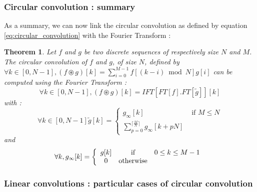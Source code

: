 \documentclass[a4paper,10pt,twoside]{article}
\newtheorem{myTheorem}{Theorem}
\begin{document}
\pagebreak
\subsubsection{Circular convolution : summary}

As a summary, we can now link the circular convolution as defined by equation \ref{eq:circular_convolution} with the Fourier Transform :
\begin{myTheorem}
Let $f$ and $g$ be two discrete sequences of respectively size $N$ and $M$. The circular convolution of $f$ and $g$, of size $N$, defined by $\forall k \in [0,N-1], (f\circledast g)[k] = \sum_{i=0}^{M-1} f[(k-i) \bmod N] g[i]$ can be computed using the Fourier Transform :
\begin{equation*}
\forall k \in [0,N-1], (f\circledast g)[k] = IFT[FT[f] . FT[\tilde{g}]][k]
\end{equation*}
with :
\begin{equation*}
\forall k \in [0,N-1] \tilde{g}[k] =
 \begin{cases}
 g_\infty[k] & \mbox{ if $M \leq N$} \\
 \sum_{p=0}^{\lceil \frac{M}{N}\rceil} g_\infty[k + pN]
 \end{cases}
\end{equation*}
and 
\begin{equation*}
\forall k, g_\infty[k] = \left\lbrace
\begin{array}{ccc}
g[k]     & \mbox{if} & 0 \leq k \leq M-1\\
0  & \mbox{otherwise}\\
\end{array}\right. \\
\end{equation*}
\end{myTheorem}

\subsubsection{Linear convolutions : particular cases of circular convolution}
\end{document}

